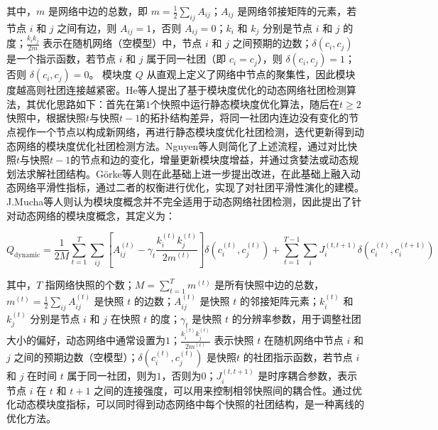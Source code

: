 其中，\( m \) 是网络中边的总数，即 \( m = \frac{1}{2} \sum_{ij} A_{ij} \)；\( A_{ij} \) 是网络邻接矩阵的元素，若节点 \( i \) 和 \( j \) 之间有边，则 \( A_{ij} = 1 \)，否则 \( A_{ij} = 0 \)；\( k_i \) 和 \( k_j \) 分别是节点 \( i \) 和 \( j \) 的度；\( \frac{k_i k_j}{2m} \) 表示在随机网络（空模型）中，节点 \( i \) 和 \( j \) 之间预期的边数；\( \delta(c_i, c_j) \) 是一个指示函数，若节点 \( i \) 和 \( j \) 属于同一社团（即 \( c_i = c_j \)），则 \( \delta(c_i, c_j) = 1 \)；否则 \( \delta(c_i, c_j) = 0 \)。
模块度 \( Q \) 从直观上定义了网络中节点的聚集性，因此模块度越高则社团连接越紧密。He等人\cite{he2015fast}提出了基于模块度优化的动态网络社团检测算法，其优化思路如下：首先在第\(1\)个快照中运行静态模块度优化算法，随后在$t \ge 2$快照中，根据快照$t$与快照$t-1$的拓扑结构差异，将同一社团内连边没有变化的节点视作一个节点以构成新网络，再进行静态模块度优化社团检测，迭代更新得到动态网络的模块度优化社团检测方法。Nguyen等人\cite{nguyen2011adaptive}则简化了上述流程，通过对比快照$t$与快照$t-1$的节点和边的变化，增量更新模块度增益，并通过贪婪法或动态规划法求解社团结构。G{\"o}rke等人\cite{gorke2013dynamic}则在此基础上进一步提出改进，在此基础上融入动态网络平滑性指标，通过二者的权衡进行优化，实现了对社团平滑性演化的建模。J.Mucha等人\cite{mucha2010community}则认为模块度概念并不完全适用于动态网络社团检测，因此提出了针对动态网络的模块度概念，其定义为：

\[
Q_{\text{dynamic}} = \frac{1}{2M} \sum_{t=1}^{T} \sum_{ij} \left[ A_{ij}^{(t)} - \gamma_t \frac{k_i^{(t)} k_j^{(t)}}{2m^{(t)}} \right] \delta(c_i^{(t)}, c_j^{(t)}) + \sum_{t=1}^{T-1} \sum_{i} J_{i}^{(t, t+1)} \delta(c_i^{(t)}, c_i^{(t+1)})
\]

其中，\( T \) 指网络快照的个数；\( M = \sum_{t=1}^{T} m^{(t)} \) 是所有快照中边的总数，\( m^{(t)} = \frac{1}{2} \sum_{ij} A_{ij}^{(t)} \) 是快照 \( t \) 的边数；\( A_{ij}^{(t)} \) 是快照 \( t \) 的邻接矩阵元素；\( k_i^{(t)} \) 和 \( k_j^{(t)} \) 分别是节点 \( i \) 和 \( j \) 在快照 \( t \) 的度；\( \gamma_t \) 是快照 \( t \) 的分辨率参数，用于调整社团大小的偏好，动态网络中通常设置为$1$；\( \frac{k_i^{(t)} k_j^{(t)}}{2m^{(t)}} \) 表示快照 \( t \) 在随机网络中节点 \( i \) 和 \( j \) 之间的预期边数（空模型）；\( \delta(c_i^{(t)}, c_j^{(t)}) \) 是快照\( t \) 的社团指示函数，若节点 \( i \) 和 \( j \) 在时间 \( t \) 属于同一社团，则为$1$，否则为$0$；\( J_{i}^{(t, t+1)} \) 是时序耦合参数，表示节点 \( i \) 在 \( t \) 和 \( t+1 \) 之间的连接强度，可以用来控制相邻快照间的耦合性。通过优化动态模块度指标，可以同时得到动态网络中每个快照的社团结构，是一种离线的优化方法\cite{sarzynska2016null,10452807}。

